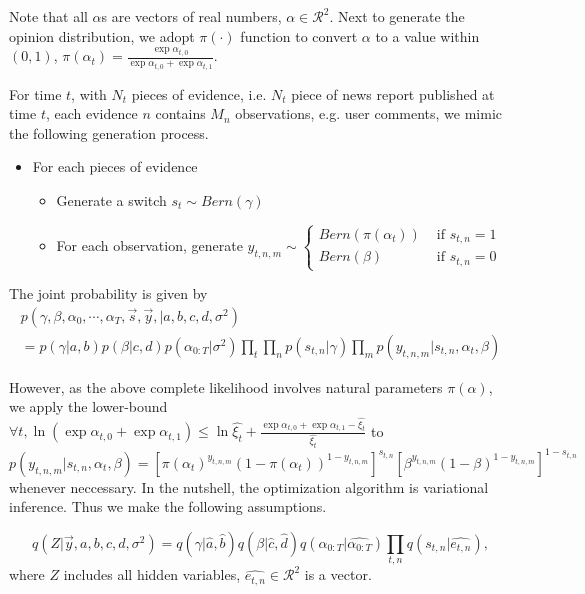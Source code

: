 \documentclass[runningheads]{llncs}
\newcommand{\Real}{\mathcal{R}}
\begin{document}
Note that all $\alpha$s  are vectors of real numbers, $\alpha\in \Real^2$. Next to generate the opinion distribution, we adopt $\pi(\cdot)$ function to convert $\alpha$ to a value within $(0,1)$, $\pi(\alpha_t)=\frac{\exp \alpha_{t,0}}{\exp \alpha_{t,0} + \exp \alpha_{t,1}}$.

For time $t$, with $N_t$ pieces of evidence, i.e. $N_t$ piece of news report published at time $t$, each evidence $n$ contains $M_n$ observations, e.g. user comments, we mimic the following generation process. 
\begin{itemize}
\item For each pieces of evidence
\begin{itemize}
\item Generate a switch $s_t \sim Bern(\gamma)$
\item For each observation, generate $y_{t,n,m}\sim \begin{cases}
Bern(\pi(\alpha_t)) & \text{ if } s_{t,n}= 1\\ 
Bern(\beta) & \text{ if } s_{t,n}= 0 
\end{cases}$
\end{itemize}
\end{itemize}

The joint probability is given by
\begin{eqnarray*}
    p(\gamma,\beta,\alpha_0,\cdots,\alpha_T, \vec{s},\vec{y}, |a,b,c,d,\sigma^2) \\
    =    p(\gamma|a,b) p(\beta|c,d)  p(\alpha_{0:T}|\sigma^2) \prod_t \prod_ n p(s_{t,n}|\gamma) \prod_m p(y_{t,n,m}|s_{t,n},\alpha_t,\beta) 
    \end{eqnarray*}

However, as the above complete likelihood involves natural parameters $\pi(\alpha)$, we apply the lower-bound $\forall t, \ln (\exp \alpha_{t,0}+ \exp \alpha_{t,1}) \leq \ln \hat{\xi_t} + \frac{\exp \alpha_{t,0} + \exp \alpha_{t,1} -\hat{\xi_t}}{\hat{\xi_t}}$ to $p(y_{t,n,m}|s_{t,n},\alpha_t,\beta) = [\pi(\alpha_t)^{y_{t,n,m}} (1-\pi(\alpha_t))^{1-y_{t,n,m}}]^{s_{t,n}} [\beta^{y_{t,n,m}}(1-\beta)^{1-y_{t,n,m}}]^{1-s_{t,n}}$ whenever neccessary.
In the nutshell, the optimization algorithm is variational inference. Thus we make the following assumptions. 

\begin{equation*}
q(Z|\vec{y},a,b,c,d,\sigma^2) = q(\gamma|\hat{a},\hat{b}) q(\beta|\hat{c},\hat{d}) q(\alpha_{0:T}|\hat{\alpha_{0:T}})\prod_{t,n} q(s_{t,n}|\hat{e_{t,n}}) , 
\end{equation*}
where $Z$ includes all hidden variables, $\hat{e_{t,n}}\in \Real^2 $ is a vector. 
\end{document}
